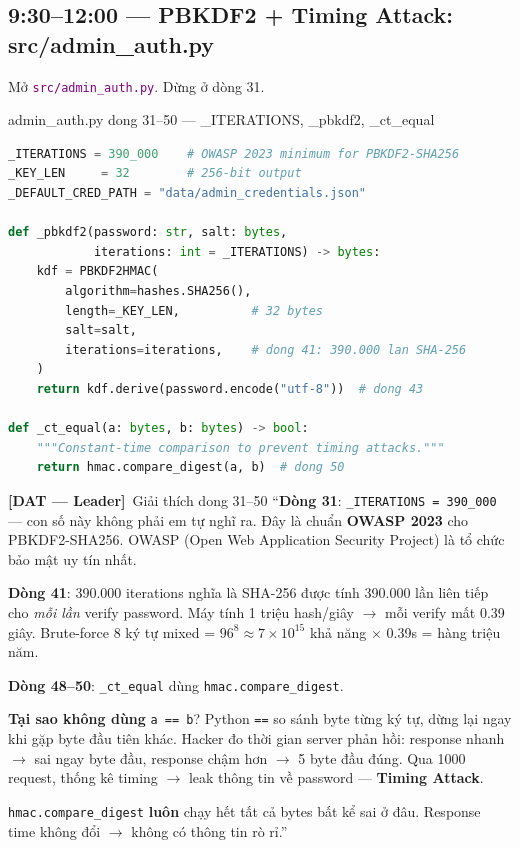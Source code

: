 \documentclass[12pt, a4paper]{article}
\newcommand{\dat}{\textcolor{BrickRed}{\textbf{[DAT --- Leader]}}}
\newcommand{\fpath}[1]{\texttt{\textcolor{purple}{#1}}}
\begin{document}
\subsection{9:30--12:00 --- PBKDF2 + Timing Attack: src/admin\_auth.py}

\begin{action}
Mở \fpath{src/admin\_auth.py}. Dừng ở dòng 31.
\end{action}

\begin{codestep}{admin\_auth.py dong 31--50 --- \_ITERATIONS, \_pbkdf2, \_ct\_equal}
\begin{lstlisting}[language=Python, firstnumber=31]
_ITERATIONS = 390_000    # OWASP 2023 minimum for PBKDF2-SHA256
_KEY_LEN     = 32        # 256-bit output
_DEFAULT_CRED_PATH = "data/admin_credentials.json"

def _pbkdf2(password: str, salt: bytes,
            iterations: int = _ITERATIONS) -> bytes:
    kdf = PBKDF2HMAC(
        algorithm=hashes.SHA256(),
        length=_KEY_LEN,          # 32 bytes
        salt=salt,
        iterations=iterations,    # dong 41: 390.000 lan SHA-256
    )
    return kdf.derive(password.encode("utf-8"))  # dong 43

def _ct_equal(a: bytes, b: bytes) -> bool:
    """Constant-time comparison to prevent timing attacks."""
    return hmac.compare_digest(a, b)  # dong 50
\end{lstlisting}
\end{codestep}

\begin{dialog}{\dat\ Giải thích dong 31--50}
``\textbf{Dòng 31}: \texttt{\_ITERATIONS = 390\_000} --- con số này không phải em tự nghĩ ra.
Đây là chuẩn \textbf{OWASP 2023} cho PBKDF2-SHA256.
OWASP (Open Web Application Security Project) là tổ chức bảo mật uy tín nhất.

\textbf{Dòng 41}: 390.000 iterations nghĩa là SHA-256 được tính 390.000 lần liên tiếp
cho \textit{mỗi lần} verify password.
Máy tính 1 triệu hash/giây $\to$ mỗi verify mất 0.39 giây.
Brute-force 8 ký tự mixed = $96^8 \approx 7\times10^{15}$ khả năng $\times$ 0.39s = hàng triệu năm.

\textbf{Dòng 48--50}: \texttt{\_ct\_equal} dùng \texttt{hmac.compare\_digest}.

\textbf{Tại sao không dùng} \texttt{a == b}?
Python \texttt{==} so sánh byte từng ký tự, dừng lại ngay khi gặp byte đầu tiên khác.
Hacker đo thời gian server phản hồi:
response nhanh $\to$ sai ngay byte đầu,
response chậm hơn $\to$ 5 byte đầu đúng.
Qua 1000 request, thống kê timing $\to$ leak thông tin về password --- \textbf{Timing Attack}.

\texttt{hmac.compare\_digest} \textbf{luôn} chạy hết tất cả bytes bất kể sai ở đâu.
Response time không đổi $\to$ không có thông tin rò rỉ.''
\end{dialog}
\end{document}

